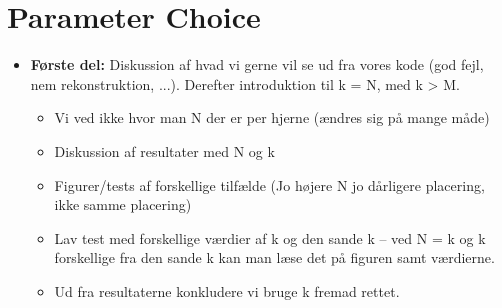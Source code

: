 \section{Parameter Choice}
\begin{itemize}
    \item \textbf{Første del:} Diskussion af hvad vi gerne vil se ud fra vores kode (god fejl, nem rekonstruktion, ...). Derefter introduktion til k = N, med k > M.
    \begin{itemize}
        \item Vi ved ikke hvor man N der er per hjerne (ændres sig på mange måde)
        \item Diskussion af resultater med N og k
        \item Figurer/tests af forskellige tilfælde (Jo højere N jo dårligere placering, ikke samme placering)
        \item Lav test med forskellige værdier af k og den sande k -- ved N = k og k forskellige fra den sande k kan man læse det på figuren samt værdierne.
        \item Ud fra resultaterne konkludere vi bruge k fremad rettet.
    \end{itemize}
\end{itemize}

